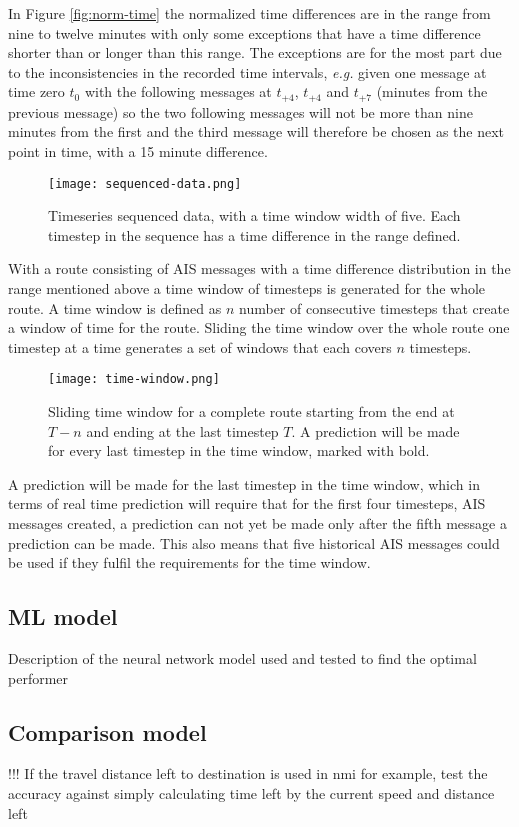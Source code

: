 \documentclass[../main.tex]{subfiles}
\begin{document}
In Figure \ref{fig:norm-time} the normalized time differences are in the range from nine to twelve minutes with only some exceptions that have a time difference shorter than or longer than this range. The exceptions are for the most part due to the inconsistencies in the recorded time intervals, \textit{e.g.} given one message at time zero $t_0$ with the following messages at $t_{+4}$, $t_{+4}$ and $t_{+7}$ (minutes from the previous message) so the two following messages will not be more than nine minutes from the first and the third message will therefore be chosen as the next point in time, with a 15 minute difference. 

\begin{figure}[H]
	\centering
	\texttt{[image: sequenced-data.png]}
	\caption{Timeseries sequenced data, with a time window width of five. Each timestep in the sequence has a time difference in the range defined.}
	\label{fig:seq-data}
\end{figure}

With a route consisting of AIS messages with a time difference distribution in the range mentioned above a time window of timesteps is generated for the whole route. A time window is defined as $n$ number of consecutive timesteps that create a window of time for the route. Sliding the time window over the whole route one timestep at a time generates a set of windows that each covers $n$ timesteps. 

\begin{figure}[H]
	\centering
	\texttt{[image: time-window.png]}
	\caption{Sliding time window for a complete route starting from the end at $T-n$ and ending at the last timestep $T$. A prediction will be made for every last timestep in the time window, marked with bold.}
	\label{fig:time-window}
\end{figure}

A prediction will be made for the last timestep in the time window, which in terms of real time prediction will require that for the first four timesteps, AIS messages created, a prediction can not yet be made only after the fifth message a prediction can be made. This also means that five historical AIS messages could be used if they fulfil the requirements for the time window.


\subsection{ML model}

Description of the neural network model used and tested to find the optimal performer


\subsection{Comparison model}

!!! If the travel distance left to destination is used in nmi for example, test the accuracy against simply calculating time left by the current speed and distance left 
\end{document}

